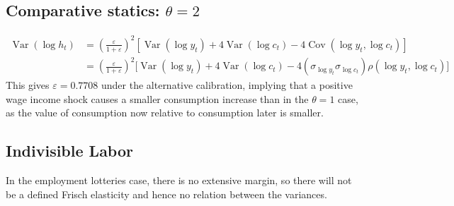 \documentclass[11pt]{amsart}
\begin{document}
\subsection{Comparative statics: $\theta = 2$}
\begin{align*}
\operatorname{Var}(\log h_t) & = \left( \frac{\varepsilon}{1+ \varepsilon}\right)^2 \left[ \operatorname{Var}(\log y_t) +  4 \operatorname{Var}(\log c_t) - 4 \operatorname{Cov}(\log y_t, \log c_t) \right] \\
& = \left( \frac{\varepsilon}{1+ \varepsilon}\right)^2 \Bigg[ \operatorname{Var}(\log y_t) + 4 \operatorname{Var}(\log c_t) - 4 \left(  \sigma_{\log y_t} \sigma_{\log c_t} \right)\rho(\log y_t, \log c_t) \Bigg]
\end{align*}
This gives $\varepsilon = 0.7708$ under the alternative calibration, implying that a positive wage income shock causes a smaller consumption increase than in the $\theta=1$ case, as the value of consumption now relative to consumption later is smaller.

\subsection{Indivisible Labor}
In the employment lotteries case, there is no extensive margin, so there will not be a defined Frisch elasticity and hence no relation between the variances.
\end{document}
